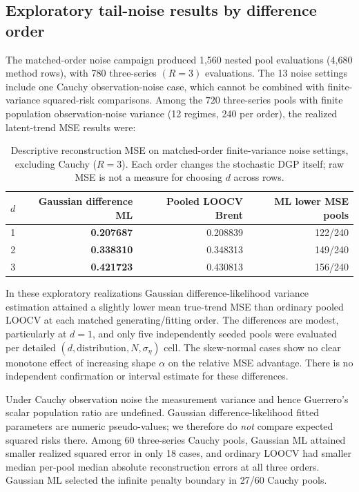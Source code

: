 \documentclass[11pt]{article}
\begin{document}
\subsection{Exploratory tail-noise results by difference order}

The matched-order noise campaign produced 1,560 nested pool
evaluations (4,680 method rows), with 780 three-series
$(R=3)$ evaluations. The 13 noise settings include one
Cauchy observation-noise case, which cannot be combined with
finite-variance squared-risk comparisons. Among the
$720$ three-series pools with finite population
observation-noise variance (12 regimes, 240 per order),
the realized latent-trend MSE results were:
\begin{table}[ht]
\centering
\caption{Descriptive reconstruction MSE on matched-order
finite-variance noise settings, excluding Cauchy ($R=3$).
Each order changes the stochastic DGP itself; raw MSE
is not a measure for choosing $d$ across rows.}
\label{tab:tail-d-orders}
\begin{tabular}{rrrr}
\toprule
$d$ & Gaussian difference ML & Pooled LOOCV Brent & ML lower MSE pools\\
\midrule
1 & \textbf{0.207687} & 0.208839 & 122/240\\
2 & \textbf{0.338310} & 0.348313 & 149/240\\
3 & \textbf{0.421723} & 0.430813 & 156/240\\
\bottomrule
\end{tabular}
\end{table}

In these exploratory realizations Gaussian difference-likelihood
variance estimation attained a slightly lower mean true-trend MSE
than ordinary pooled LOOCV at each matched generating/fitting order.
The differences are modest, particularly at $d=1$, and only
five independently seeded pools were evaluated per detailed
$(d,\text{distribution},N,\sigma_\eta)$ cell.
The skew-normal cases show no clear monotone effect of increasing
shape $\alpha$ on the relative MSE advantage. There is no
independent confirmation or interval estimate for these differences.

Under Cauchy observation noise the measurement variance and hence
Guerrero's scalar population ratio are undefined. Gaussian
difference-likelihood fitted parameters are numeric pseudo-values;
we therefore do \emph{not} compare expected squared risks there.
Among 60 three-series Cauchy pools, Gaussian ML attained smaller
realized squared error in only 18 cases, and ordinary LOOCV
had smaller median per-pool median absolute reconstruction
errors at all three orders. Gaussian ML selected the infinite
penalty boundary in 27/60 Cauchy pools.
\end{document}
